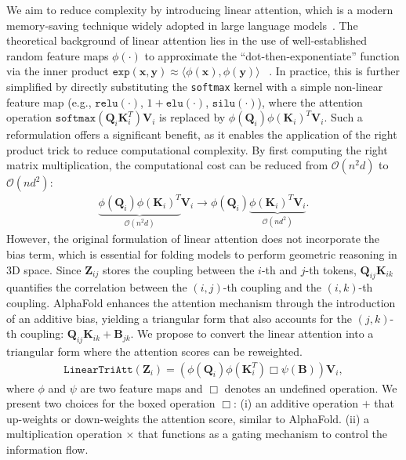 \documentclass[]{bytedance_seed}
\begin{document}
We aim to reduce complexity by introducing linear attention, which is a modern memory-saving technique widely adopted in large language models~\cite{minimax2025minimax01scalingfoundationmodels,kimiteam2025kimilinearexpressiveefficient}. The theoretical background of linear attention lies in the use of well-established random feature maps $\phi(\cdot)$ to approximate the ``dot-then-exponentiate'' function via the inner product $\mathtt{exp}(\mathbf{x}, \mathbf{y})\approx\langle\phi(\mathbf{x}), \phi(\mathbf{y})\rangle$ ~\cite{rahimi2007random,peng2021randomfeatureattention}. In practice, this is further simplified by directly substituting the \texttt{softmax} kernel with a simple non-linear feature map (e.g., $\mathtt{relu(\cdot)}$, $1+\mathtt{elu(\cdot)}$, $\mathtt{silu}(\cdot)$), where the attention operation $\mathtt{softmax}(\mathbf{Q}_i\mathbf{K}_i^T)\mathbf{V}_i$ is replaced by $\phi(\mathbf{Q}_i)\phi(\mathbf{K}_i)^T\mathbf{V}_i$. Such a reformulation offers a significant benefit, as it enables the application of the right product trick to reduce computational complexity. By first computing the right matrix multiplication, the computational cost can be reduced from $\mathcal{O}(n^2d)$ to  $\mathcal{O}(nd^2)$:
\begin{align}
\underbrace{\phi(\mathbf{Q}_i)\phi(\mathbf{K}_i)^T}_{\mathcal{O}(n^2d)}\mathbf{V}_i
\rightarrow \phi(\mathbf{Q}_i)\underbrace{\phi(\mathbf{K}_i)^T\mathbf{V}_i}_{\mathcal{O}(nd^2)}.
\end{align}
However, the original formulation of linear attention does not incorporate the bias term, which is essential for folding models to perform geometric reasoning in 3D space. Since $\mathbf{Z}_{ij}$ stores the coupling between the $i$-th and $j$-th tokens, $\mathbf{Q}_{ij}\mathbf{K}_{ik}$ quantifies the correlation between the $(i,j)$-th coupling and the $(i,k)$-th coupling. AlphaFold enhances the attention mechanism through the introduction of an additive bias, yielding a triangular form that also accounts for the $(j,k)$-th coupling: $\mathbf{Q}_{ij}\mathbf{K}_{ik}+\mathbf{B}_{jk}$.
We propose to convert the linear attention into a triangular form where the attention scores can be reweighted.
\begin{align}
    \mathtt{LinearTriAtt}(\mathbf{Z}_i) = \left(\phi(\mathbf{Q}_i)\phi(\mathbf{K}_i^T)\Box\psi(\mathbf{B})\right)\mathbf{V}_i,
\end{align}
where $\phi$ and $\psi$ are two feature maps and $\Box$ denotes an undefined operation. We present two choices for the boxed operation $\Box$: (i) an additive operation $+$ that up-weights or down-weights the attention score, similar to AlphaFold. (ii) a multiplication operation $\times$ that functions as a gating mechanism to control the information flow.
\end{document}
